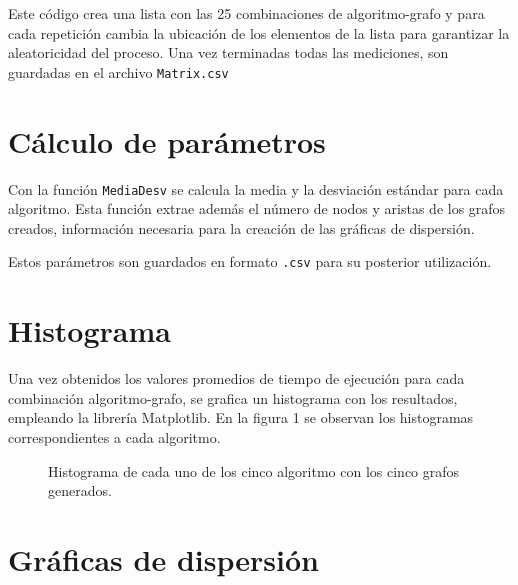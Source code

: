 \documentclass{article}
\begin{document}
 

Este código crea una lista con las 25 combinaciones de algoritmo-grafo y para cada repetición cambia la ubicación de los elementos de la lista para garantizar la aleatoricidad del proceso. Una vez terminadas todas las mediciones, son guardadas en el archivo \texttt{Matrix.csv}

\section*{Cálculo de parámetros}

Con la función \texttt{MediaDesv} se calcula la media y la desviación estándar para cada algoritmo. Esta función extrae además el número de nodos y aristas de los grafos creados, información necesaria para la creación de las gráficas de dispersión.

 

Estos parámetros son guardados en formato \texttt{.csv} para su posterior utilización.


\section*{Histograma}

Una vez obtenidos los valores promedios de tiempo de ejecución para cada combinación algoritmo-grafo, se grafica un histograma con los resultados, empleando la librería Matplotlib\cite{matplotlib}. En la figura 1 se observan los histogramas correspondientes a cada algoritmo.


\begin{figure}[htbp]

\caption{Histograma de cada uno de los cinco algoritmo con los cinco grafos generados.} 
\end{figure}

\section*{Gráficas de dispersión}
\end{document}
